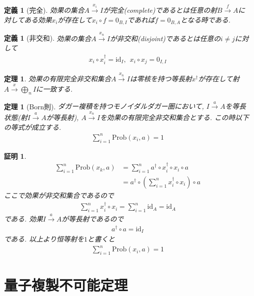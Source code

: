 \documentclass[a4paper,12pt]{ltjsarticle}
\theoremstyle{break}
\newtheorem{defn}[thm]{定義}
\newtheorem{thrm}[thm]{定理}
\newtheorem*{prf}{証明}
\newcommand{\prob}{\mathrm{Prob}}
\newcommand{\xr}[1]{\xrightarrow{#1}}
\newcommand{\id}{\mathrm{id}}
\newcommand{\ci}{\circ}
\newcommand{\da}{\dagger}
\newcommand{\bigop}{\bigoplus}
\numberwithin{equation}{section}
\begin{document}
\begin{defn}[完全]
  効果の集合$A \xr{x_i} I$が完全(complete)であるとは任意の射$B \xr{f} A$に対してある効果$x_i$が存在して$x_i \ci f = 0_{B,I}$であれば$f = 0_{B,A}$となる時である. 
\end{defn}

\begin{defn}[非交和]
  効果の集合$A \xr{x_n} I$が非交和(disjoint)であるとは任意の$i \neq j$に対して
  \begin{align*}
    x_i \ci x_i^\da = \id_I, ~~ x_i \ci x_j = 0_{I,I} 
  \end{align*}
\end{defn}

\begin{thrm}
  効果の有限完全非交和集合$A \xr{x_n} I$は零核を持つ等長射$x^\da$が存在して射$A \xr{x} \bigop_n I$に一致する. 
\end{thrm}

\begin{thrm}[Born則]
  ダガー複積を持つモノイダルダガー圏において,  $I \xr{a} A$を等長状態(射$I \xr{a} A$が等長射), $A \xr{x_n} I$を効果の有限完全非交和集合とする. 
  この時以下の等式が成立する. 　
　\begin{align*}
    \sum_{i=1}^n \prob(x_i,a)=1
  \end{align*}
\end{thrm}

\begin{prf}
  \begin{align*}
    \sum_{i=1}^n \prob(x_k,a)
    &= \sum_{i=1}^n a^\da \ci x_i^\da \ci x_i \ci a \\
    &= a^\da \ci \left( \sum_{i=1}^n x_i^\da \ci x_i \right) \ci a
  \end{align*}
  ここで効果が非交和集合であるので
  \begin{align*}
    \sum_{i=1}^n x_i^\da \ci x_i
    = \sum_{i=1}^n \id_A
    = \id_A
  \end{align*}
  である. 
  効果$I \xr{a} A$が等長射であるので
  \begin{align*}
    a^\da \ci a = \id_I
  \end{align*}
  である. 
  以上より恒等射を$1$と書くと%
  \begin{align*}
    \sum_{i=1}^n \prob(x_i,a)=1
  \end{align*}
\end{prf}

\newpage

\section{量子複製不可能定理}
\end{document}
